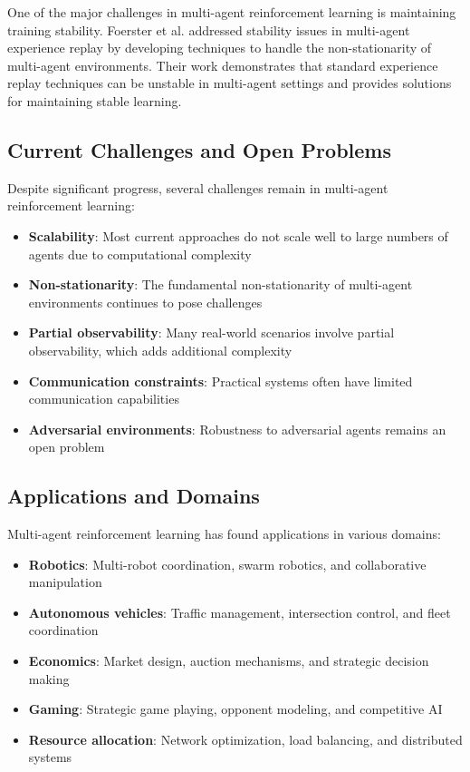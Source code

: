 \documentclass[conference]{IEEEtran}
\begin{document}
One of the major challenges in multi-agent reinforcement learning is maintaining training stability. Foerster et al. \cite{foerster2018stabilising} addressed stability issues in multi-agent experience replay by developing techniques to handle the non-stationarity of multi-agent environments. Their work demonstrates that standard experience replay techniques can be unstable in multi-agent settings and provides solutions for maintaining stable learning.

\subsection{Current Challenges and Open Problems}

Despite significant progress, several challenges remain in multi-agent reinforcement learning:

\begin{itemize}
    \item \textbf{Scalability}: Most current approaches do not scale well to large numbers of agents due to computational complexity
    \item \textbf{Non-stationarity}: The fundamental non-stationarity of multi-agent environments continues to pose challenges
    \item \textbf{Partial observability}: Many real-world scenarios involve partial observability, which adds additional complexity
    \item \textbf{Communication constraints}: Practical systems often have limited communication capabilities
    \item \textbf{Adversarial environments}: Robustness to adversarial agents remains an open problem
\end{itemize}

\subsection{Applications and Domains}

Multi-agent reinforcement learning has found applications in various domains:

\begin{itemize}
    \item \textbf{Robotics}: Multi-robot coordination, swarm robotics, and collaborative manipulation
    \item \textbf{Autonomous vehicles}: Traffic management, intersection control, and fleet coordination
    \item \textbf{Economics}: Market design, auction mechanisms, and strategic decision making
    \item \textbf{Gaming}: Strategic game playing, opponent modeling, and competitive AI
    \item \textbf{Resource allocation}: Network optimization, load balancing, and distributed systems
\end{itemize}
\end{document}
